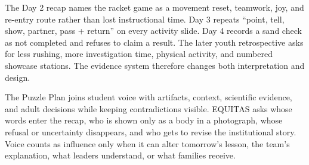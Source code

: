 
The Day 2 recap names the racket game as a movement reset, teamwork, joy, and re-entry route rather than lost instructional time. Day 3 repeats ``point, tell, show, partner, pass + return'' on every activity slide. Day 4 records a sand check as not completed and refuses to claim a result. The later youth retrospective asks for less rushing, more investigation time, physical activity, and numbered showcase stations. The evidence system therefore changes both interpretation and design.


The Puzzle Plan joins student voice with artifacts, context, scientific evidence, and adult decisions while keeping contradictions visible. EQUITAS asks whose words enter the recap, who is shown only as a body in a photograph, whose refusal or uncertainty disappears, and who gets to revise the institutional story. Voice counts as influence only when it can alter tomorrow's lesson, the team's explanation, what leaders understand, or what families receive.



\normalsize